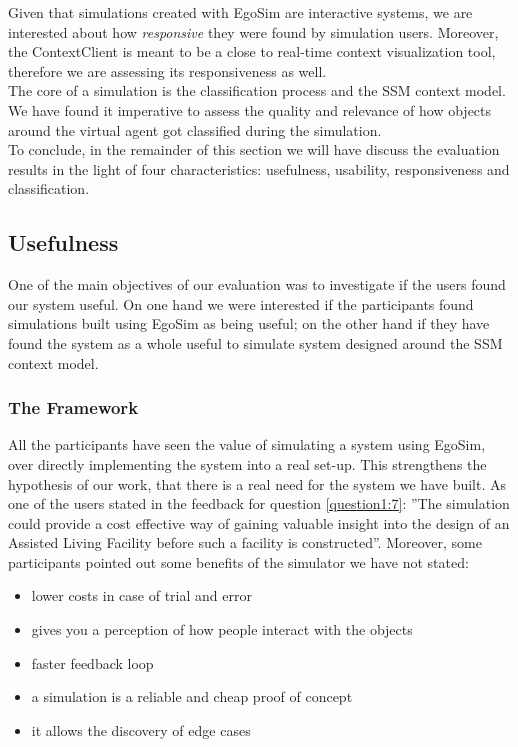 Given that simulations created with EgoSim are interactive systems, we are interested about how \emph{responsive} they were found by simulation users. Moreover, the ContextClient is meant to be a close to real-time context visualization tool, therefore we are assessing its responsiveness as well.\\

The core of a simulation is the classification process and the SSM context model. We have found it imperative to assess the quality and relevance of how objects around the virtual agent got classified during the simulation.\\

To conclude, in the remainder of this section we will have discuss the evaluation results in the light of four characteristics: usefulness, usability, responsiveness and classification.\\

\subsection{Usefulness} %
\label{sec:eval_usefulness}
One of the main objectives of our evaluation was to investigate if the users found our system useful. On one hand we were interested if the participants found simulations built using EgoSim as being useful; on the other hand if they have found the system as a whole useful to simulate system designed around the SSM context model.\\

\subsubsection{The Framework} %
All the participants have seen the value of simulating a system using EgoSim, over directly implementing the system into a real set-up. This strengthens the hypothesis of our work, that there is a real need for the system we have built. As one of the users stated in the feedback for question \ref{question1:7}: ''The simulation could provide a cost effective way of gaining valuable insight into the design of an Assisted Living Facility before such a facility is constructed''. Moreover, some participants pointed out some benefits of the simulator we have not stated:
\begin{itemize}
	\item lower costs in case of trial and error
	\item gives you a perception of how people interact with the objects
	\item faster feedback loop
	\item a simulation is a reliable and cheap proof of concept
	\item it allows the discovery of edge cases
\end{itemize}

